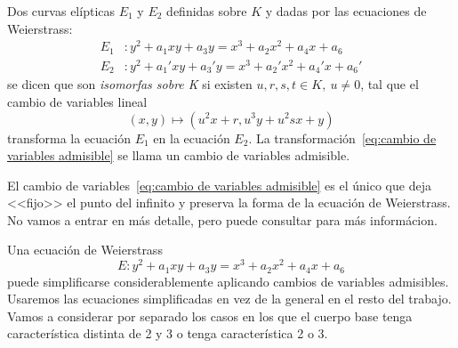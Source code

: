 \begin{definicion}
	Dos curvas elípticas $E_1$ y $E_2$ definidas sobre $K$ y dadas por las ecuaciones de Weierstrass:
	\begin{align*}
		E_1 &: y^2 + a_1 x y + a_3 y = x^3 + a_2 x^2 + a_4 x + a_6 \\
		E_2 &: y^2 + a_1' x y + a_3' y = x^3 + a_2' x^2 + a_4' x + a_6'
	\end{align*}
	se dicen que son \emph{isomorfas sobre K} si existen $u, r, s, t \in K,\ u \neq 0$, tal que el cambio de variables lineal
	\begin{equation}\label{eq:cambio de variables admisible}
	(x, y) \mapsto (u^2 x + r, u^3 y + u^2 s x + y)
	\end{equation}
	transforma la ecuación $E_1$ en la ecuación $E_2$. La transformación~\eqref{eq:cambio de variables admisible} se llama un cambio de variables admisible.

	El cambio de variables~\eqref{eq:cambio de variables admisible} es el único que deja <<fijo>> el punto del infinito y preserva la forma de la ecuación de Weierstrass. No vamos a entrar en más detalle, pero puede consultar \citet[proposición III.3.1b]{Silverman:2009} para más informácion.
\end{definicion}


Una ecuación de Weierstrass
$$
E:  y^2 + a_1 x y + a_3 y = x^3 + a_2 x^2 + a_4 x + a_6
$$
puede simplificarse considerablemente aplicando cambios de variables admisibles. Usaremos las ecuaciones simplificadas en vez de la general en el resto del trabajo. Vamos a considerar por separado los casos en los que el cuerpo base tenga característica distinta de 2 y 3 o tenga característica 2 o 3.

